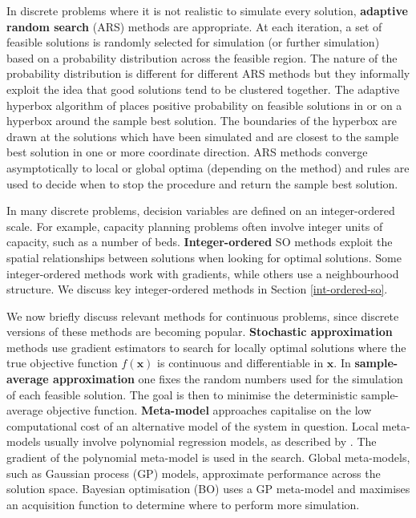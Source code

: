 \documentclass[12pt,a4paper]{article}
\begin{document}
In discrete problems where it is not realistic to simulate every solution, \textbf{adaptive random search} (ARS) methods are appropriate. At each iteration, a set of feasible solutions is randomly selected for simulation (or further simulation) based on a probability distribution across the feasible region. The nature of the probability distribution is different for different ARS methods but they informally exploit the idea that good solutions tend to be clustered together. The adaptive hyperbox algorithm of \cite{xu2013adaptive} places positive probability on feasible solutions in or on a hyperbox around the sample best solution. The boundaries of the hyperbox are drawn at the solutions which have been simulated and are closest to the sample best solution in one or more coordinate direction. ARS methods converge asymptotically to local or global optima (depending on the method) and rules are used to decide when to stop the procedure and return the sample best solution.

In many discrete problems, decision variables are defined on an integer-ordered scale. For example, capacity planning problems often involve integer units of capacity, such as a number of beds. \textbf{Integer-ordered} SO methods exploit the spatial relationships between solutions when looking for optimal solutions. Some integer-ordered methods work with gradients, while others use a neighbourhood structure. We discuss key integer-ordered methods in Section \ref{int-ordered-so}. 

We now briefly discuss relevant methods for continuous problems, since discrete versions of these methods are becoming popular. \textbf{Stochastic approximation} methods \citep{fu2006gradient} use gradient estimators to search for locally optimal solutions where the true objective function $f(\boldsymbol{x})$ is continuous and differentiable in $\boldsymbol{x}$. In \textbf{sample-average approximation} \citep{Kim2015} one fixes the random numbers used for the simulation of each feasible solution. The goal is then to minimise the deterministic sample-average objective function. \textbf{Meta-model} approaches capitalise on the low computational cost of an alternative model of the system in question. Local meta-models usually involve polynomial regression models, as described by \cite{barton2006metamodel}. The gradient of the polynomial meta-model is used in the search. Global meta-models, such as Gaussian process (GP) models, approximate performance across the solution space. Bayesian optimisation (BO) \citep{frazier2018bayesian} uses a GP meta-model and maximises an acquisition function to determine where to perform more simulation.
\end{document}
